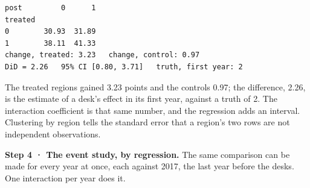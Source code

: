 \documentclass[
  letterpaper,
  10pt,
  twoside,
  openright,
  numbers=noenddot,
  chapterprefix=true]{scrbook}
\begin{document}
\begin{verbatim}
post         0      1
treated              
0        30.93  31.89
1        38.11  41.33
change, treated: 3.23   change, control: 0.97
DiD = 2.26   95% CI [0.80, 3.71]   truth, first year: 2
\end{verbatim}

The treated regions gained 3.23 points and the controls 0.97; the
difference, 2.26, is the estimate of a desk's effect in its first year,
against a truth of 2. The interaction coefficient is that same number,
and the regression adds an interval. Clustering by region tells the
standard error that a region's two rows are not independent
observations.

\textbf{Step 4 · The event study, by regression.} The same comparison
can be made for every year at once, each against 2017, the last year
before the desks. One interaction per year does it.
\end{document}
